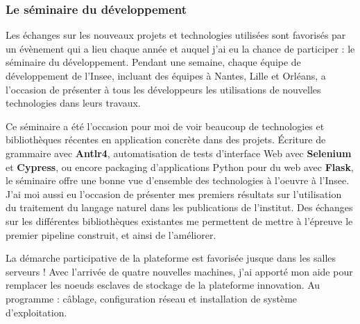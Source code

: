 \subsubsection*{Le séminaire du développement}
Les échanges sur les nouveaux projets et technologies utilisées sont favorisés par un évènement qui a lieu chaque année et auquel j'ai eu la chance de participer : le séminaire du développement. Pendant une semaine, chaque équipe de développement de l'Insee, incluant des équipes à Nantes, Lille et Orléans, a l'occasion de présenter à tous les développeurs les utilisations de nouvelles technologies dans leurs travaux.
\newline


Ce séminaire a été l'occasion pour moi de voir beaucoup de technologies et bibliothèques récentes en application concrète dans des projets. Écriture de grammaire avec \textbf{Antlr4}, automatisation de tests d'interface Web avec \textbf{Selenium} et \textbf{Cypress}, ou encore packaging d'applications Python pour du web avec \textbf{Flask}, le séminaire offre une bonne vue d'ensemble des technologies à l'oeuvre à l'Insee. J'ai moi aussi eu l'occasion de présenter mes premiers résultats sur l'utilisation du traitement du langage naturel dans les publications de l'institut. Des échanges sur les différentes bibliothèques existantes me permettent de mettre à l'épreuve le premier pipeline construit, et ainsi de l'améliorer.
\newline

La démarche participative de la plateforme est favorisée jusque dans les salles serveurs ! Avec l'arrivée de quatre nouvelles machines, j'ai apporté mon aide pour remplacer les noeuds esclaves de stockage de la plateforme innovation. Au programme : câblage, configuration réseau et installation de système d'exploitation. 

